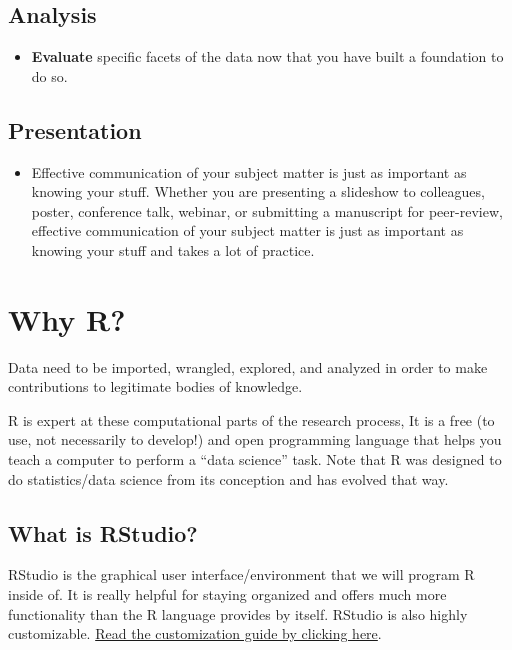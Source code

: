 \documentclass[
]{article}
\providecommand{\tightlist}{%
  \setlength{\itemsep}{0pt}\setlength{\parskip}{0pt}}
\begin{document}
\hypertarget{analysis}{%
\subsection{Analysis}\label{analysis}}

\begin{itemize}
\tightlist
\item
  \textbf{Evaluate} specific facets of the data now that you have built
  a foundation to do so.
\end{itemize}

\hypertarget{presentation}{%
\subsection{Presentation}\label{presentation}}

\begin{itemize}
\tightlist
\item
  Effective communication of your subject matter is just as important as
  knowing your stuff. Whether you are presenting a slideshow to
  colleagues, poster, conference talk, webinar, or submitting a
  manuscript for peer-review, effective communication of your subject
  matter is just as important as knowing your stuff and takes a lot of
  practice.
\end{itemize}

\hypertarget{why-r}{%
\section{Why R?}\label{why-r}}

Data need to be imported, wrangled, explored, and analyzed in order to
make contributions to legitimate bodies of knowledge.

R is expert at these computational parts of the research process, It is
a free (to use, not necessarily to develop!) and open programming
language that helps you teach a computer to perform a ``data science''
task. Note that R was designed to do statistics/data science from its
conception and has evolved that way.

\hypertarget{what-is-rstudio}{%
\subsection{What is RStudio?}\label{what-is-rstudio}}

RStudio is the graphical user interface/environment that we will program
R inside of. It is really helpful for staying organized and offers much
more functionality than the R language provides by itself. RStudio is
also highly customizable.
\href{https://support.rstudio.com/hc/en-us/articles/200549016-Customizing-the-RStudio-IDE}{Read
the customization guide by clicking here}.
\end{document}
